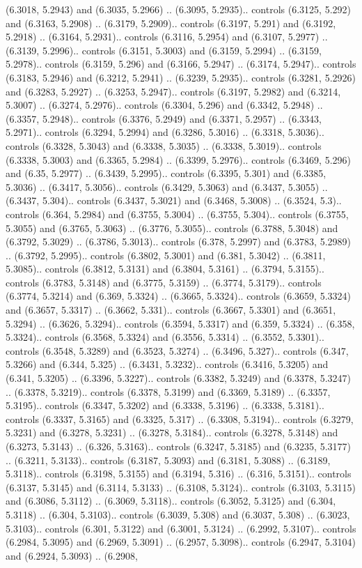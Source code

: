 (6.3018, 5.2943) and (6.3035, 5.2966) .. (6.3095, 5.2935).. controls (6.3125, 5.292) and (6.3163, 5.2908) .. (6.3179, 5.2909).. controls (6.3197, 5.291) and (6.3192, 5.2918) .. (6.3164, 5.2931).. controls (6.3116, 5.2954) and (6.3107, 5.2977) .. (6.3139, 5.2996).. controls (6.3151, 5.3003) and (6.3159, 5.2994) .. (6.3159, 5.2978).. controls (6.3159, 5.296) and (6.3166, 5.2947) .. (6.3174, 5.2947).. controls (6.3183, 5.2946) and (6.3212, 5.2941) .. (6.3239, 5.2935).. controls (6.3281, 5.2926) and (6.3283, 5.2927) .. (6.3253, 5.2947).. controls (6.3197, 5.2982) and (6.3214, 5.3007) .. (6.3274, 5.2976).. controls (6.3304, 5.296) and (6.3342, 5.2948) .. (6.3357, 5.2948).. controls (6.3376, 5.2949) and (6.3371, 5.2957) .. (6.3343, 5.2971).. controls (6.3294, 5.2994) and (6.3286, 5.3016) .. (6.3318, 5.3036).. controls (6.3328, 5.3043) and (6.3338, 5.3035) .. (6.3338, 5.3019).. controls (6.3338, 5.3003) and (6.3365, 5.2984) .. (6.3399, 5.2976).. controls (6.3469, 5.296) and (6.35, 5.2977) .. (6.3439, 5.2995).. controls (6.3395, 5.301) and (6.3385, 5.3036) .. (6.3417, 5.3056).. controls (6.3429, 5.3063) and (6.3437, 5.3055) .. (6.3437, 5.304).. controls (6.3437, 5.3021) and (6.3468, 5.3008) .. (6.3524, 5.3).. controls (6.364, 5.2984) and (6.3755, 5.3004) .. (6.3755, 5.304).. controls (6.3755, 5.3055) and (6.3765, 5.3063) .. (6.3776, 5.3055).. controls (6.3788, 5.3048) and (6.3792, 5.3029) .. (6.3786, 5.3013).. controls (6.378, 5.2997) and (6.3783, 5.2989) .. (6.3792, 5.2995).. controls (6.3802, 5.3001) and (6.381, 5.3042) .. (6.3811, 5.3085).. controls (6.3812, 5.3131) and (6.3804, 5.3161) .. (6.3794, 5.3155).. controls (6.3783, 5.3148) and (6.3775, 5.3159) .. (6.3774, 5.3179).. controls (6.3774, 5.3214) and (6.369, 5.3324) .. (6.3665, 5.3324).. controls (6.3659, 5.3324) and (6.3657, 5.3317) .. (6.3662, 5.331).. controls (6.3667, 5.3301) and (6.3651, 5.3294) .. (6.3626, 5.3294).. controls (6.3594, 5.3317) and (6.359, 5.3324) .. (6.358, 5.3324).. controls (6.3568, 5.3324) and (6.3556, 5.3314) .. (6.3552, 5.3301).. controls (6.3548, 5.3289) and (6.3523, 5.3274) .. (6.3496, 5.327).. controls (6.347, 5.3266) and (6.344, 5.325) .. (6.3431, 5.3232).. controls (6.3416, 5.3205) and (6.341, 5.3205) .. (6.3396, 5.3227).. controls (6.3382, 5.3249) and (6.3378, 5.3247) .. (6.3378, 5.3219).. controls (6.3378, 5.3199) and (6.3369, 5.3189) .. (6.3357, 5.3195).. controls (6.3347, 5.3202) and (6.3338, 5.3196) .. (6.3338, 5.3181).. controls (6.3337, 5.3165) and (6.3325, 5.317) .. (6.3308, 5.3194).. controls (6.3279, 5.3231) and (6.3278, 5.3231) .. (6.3278, 5.3184).. controls (6.3278, 5.3148) and (6.3273, 5.3143) .. (6.326, 5.3163).. controls (6.3247, 5.3185) and (6.3235, 5.3177) .. (6.3211, 5.3133).. controls (6.3187, 5.3093) and (6.3181, 5.3088) .. (6.3189, 5.3118).. controls (6.3198, 5.3155) and (6.3194, 5.316) .. (6.316, 5.3151).. controls (6.3137, 5.3145) and (6.3114, 5.3133) .. (6.3108, 5.3124).. controls (6.3103, 5.3115) and (6.3086, 5.3112) .. (6.3069, 5.3118).. controls (6.3052, 5.3125) and (6.304, 5.3118) .. (6.304, 5.3103).. controls (6.3039, 5.308) and (6.3037, 5.308) .. (6.3023, 5.3103).. controls (6.301, 5.3122) and (6.3001, 5.3124) .. (6.2992, 5.3107).. controls (6.2984, 5.3095) and (6.2969, 5.3091) .. (6.2957, 5.3098).. controls (6.2947, 5.3104) and (6.2924, 5.3093) .. (6.2908, 